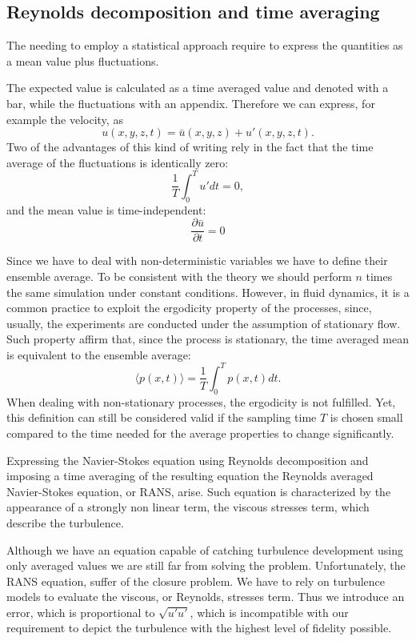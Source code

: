 \subsection{Reynolds decomposition and time averaging}
The needing to employ a statistical approach require to express the quantities as a mean value plus fluctuations.\par
The expected value is calculated as a time averaged value and denoted with a bar, while the fluctuations with an appendix. Therefore we can express, for example the velocity, as
\begin{equation}
u(x,y,z,t) = \bar{u}(x,y,z) + u'(x,y,z,t).
\end{equation}
Two of the advantages of this kind of writing rely in the fact that the time average of the fluctuations is identically zero:
\begin{equation}
\frac{1}{T} \int_{0}^{T} u' dt =0,
\end{equation}
and the mean value is time-independent:
\begin{equation}
\frac{\partial \bar{u} }{\partial t} = 0
\end{equation}
\par
Since we have to deal with non-deterministic variables we have to define their ensemble average. To be consistent with the theory we should perform $n$ times the same simulation under constant conditions.
However, in fluid dynamics, it is a common practice to exploit the ergodicity property of the processes, since, usually, the experiments are conducted under the assumption of stationary flow. 
Such property affirm that, since the process is stationary, the time averaged mean is equivalent to the ensemble average:
\begin{equation}
\langle p(x,t) \rangle = \frac{1}{T} \int_{0}^{T} p(x,t) dt.
\end{equation}
When dealing with non-stationary processes, the ergodicity is not fulfilled. Yet, this definition can still be considered valid if the sampling time $T$ is chosen small compared to the time needed for the average properties to change significantly.
\par
Expressing the Navier-Stokes equation using Reynolds decomposition and imposing a time averaging of the resulting equation the Reynolds averaged Navier-Stokes equation, or RANS, arise. Such equation is characterized by the appearance of a strongly non linear term, the viscous stresses term, which describe the turbulence.
\par
Although we have an equation capable of catching turbulence development using only averaged values we are still far from solving the problem. Unfortunately, the RANS equation, suffer of the closure problem. We have to rely on turbulence models to evaluate the viscous, or Reynolds, stresses term. Thus we introduce an error, which is proportional to $\sqrt{u'u'}$, which is incompatible with our requirement to depict the turbulence with the highest level of fidelity possible.





